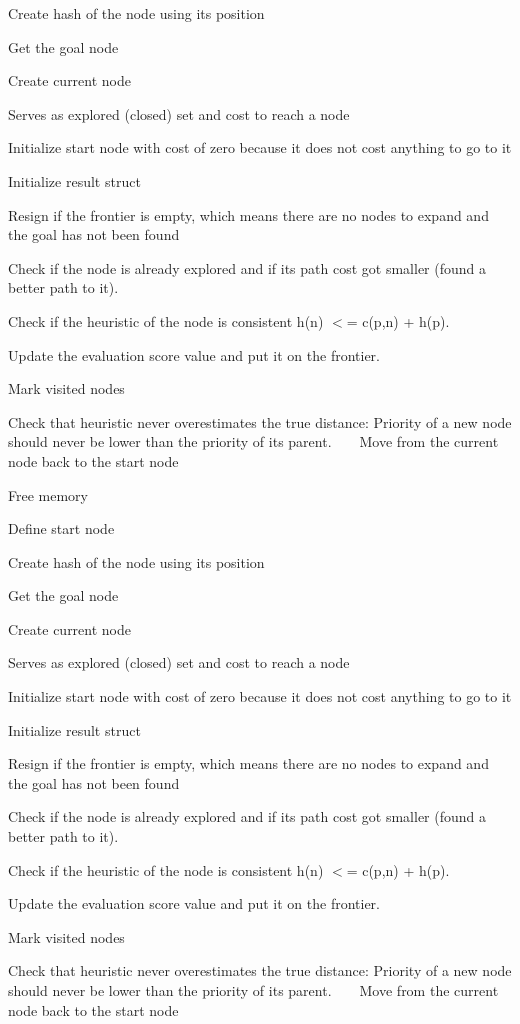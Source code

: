 Create hash of the node using its position

Get the goal node

Create current node

Serves as explored (closed) set and cost to reach a node

Initialize start node with cost of zero because it does not cost anything to go to it

Initialize result struct

Resign if the frontier is empty, which means there are no nodes to expand and the goal has not been found

Check if the node is already explored and if its path cost got smaller (found a better path to it).

Check if the heuristic of the node is consistent h(n) $<$= c(p,n) + h(p).

Update the evaluation score value and put it on the frontier.

Mark visited nodes

Check that heuristic never overestimates the true distance\+: Priority of a new node should never be lower than the priority of its parent. ~\newline
~\newline
 Move from the current node back to the start node

Free memory

Define start node

Create hash of the node using its position

Get the goal node

Create current node

Serves as explored (closed) set and cost to reach a node

Initialize start node with cost of zero because it does not cost anything to go to it

Initialize result struct

Resign if the frontier is empty, which means there are no nodes to expand and the goal has not been found

Check if the node is already explored and if its path cost got smaller (found a better path to it).

Check if the heuristic of the node is consistent h(n) $<$= c(p,n) + h(p).

Update the evaluation score value and put it on the frontier.

Mark visited nodes

Check that heuristic never overestimates the true distance\+: Priority of a new node should never be lower than the priority of its parent. ~\newline
~\newline
 Move from the current node back to the start node

